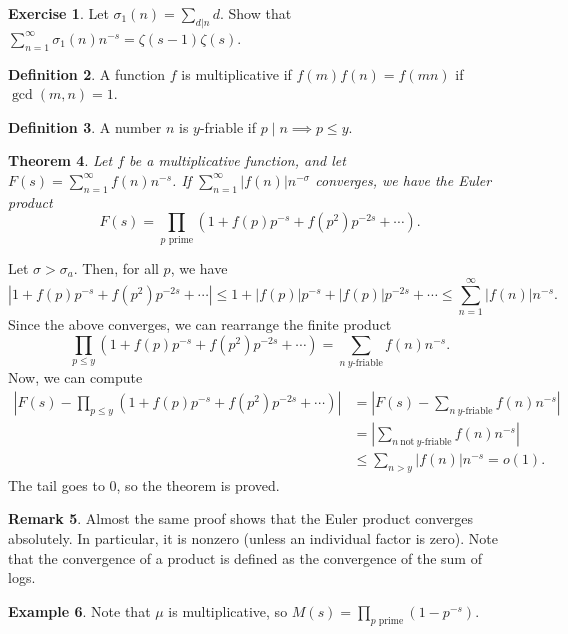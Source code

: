 \documentclass[11pt]{article}
\newtheorem{thm}{Theorem}[subsection]
\theoremstyle{definition}
\newtheorem{defn}[thm]{Definition}
\newtheorem{example}[thm]{Example}
\newtheorem{exe}[thm]{Exercise}
\newtheorem{remark}[thm]{Remark}
\newcommand{\s}[0]{\sigma}
\newcommand{\abs}[1]{\left\lvert#1\right\rvert} %
\begin{document}
\begin{exe}
Let $\sigma_1(n)=\sum_{d|n}d$. Show that
$\sum_{n=1}^\infty\sigma_1(n)n^{-s}=\zeta(s-1)\zeta(s)$.
\end{exe}

\begin{defn}
A function $f$ is multiplicative if $f(m)f(n)=f(mn)$ if $\gcd(m,n)=1$.
\end{defn}

\begin{defn}
A number $n$ is $y$-friable if $p\mid n \implies p\le y$.
\end{defn}

\begin{thm}
Let $f$ be a multiplicative function, and let $F(s)=\sum_{n=1}^\infty f(n)n^{-s}$. If
$\sum_{n=1}^\infty\abs{f(n)}n^{-\s}$ converges, we have the Euler product
\[
  F(s) = \prod_{p\text{ prime}} (1 + f(p)p^{-s} + f(p^2)p^{-2s} + \cdots) .
\]
\end{thm}
\proof
Let $\s>\s_a$. Then, for all $p$, we have
\[
\abs{1 + f(p)p^{-s} + f(p^2)p^{-2s} + \cdots}
\le 1 + \abs{f(p)}p^{-s} + \abs{f(p)}p^{-2s} + \cdots
\le \sum_{n=1}^\infty \abs{f(n)}n^{-s} .
\]
Since the above converges, we can rearrange the finite product
\[
\prod_{p\le y} (1 + f(p)p^{-s} + f(p^2)p^{-2s} + \cdots)
= \sum_{n~y\text{-friable}} f(n)n^{-s} .
\]
Now, we can compute
\begin{align*}
\abs{F(s) - \prod_{p\le y} (1 + f(p)p^{-s} + f(p^2)p^{-2s} + \cdots)}
&= \abs{F(s) - \sum_{n~y\text{-friable}} f(n)n^{-s}} \\
&= \abs{\sum_{n~\text{not}~y\text{-friable}} f(n)n^{-s}} \\
&\le \sum_{n>y} \abs{f(n)}n^{-s} = o(1) .
\end{align*}
The tail goes to 0, so the theorem is proved.
\qedhere

\begin{remark}
Almost the same proof shows that the Euler product converges absolutely. In particular, it
is nonzero (unless an individual factor is zero). Note that the convergence of a product is
defined as the convergence of the sum of logs.
\end{remark}

\begin{example}
Note that $\mu$ is multiplicative, so $M(s)=\prod_{p\text{ prime}}(1-p^{-s})$.
\end{example}












\end{document}
